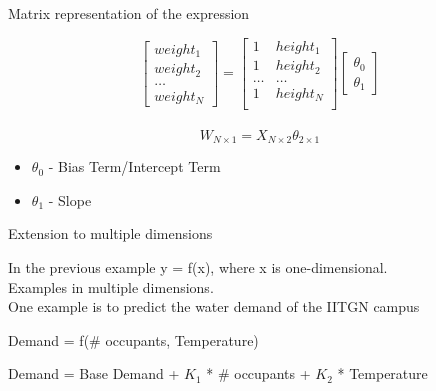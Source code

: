 \documentclass{beamer}
\begin{document}
\begin{frame}{Matrix representation of the expression}



\[\begin{bmatrix}
    weight_{1}   \\
    weight_{2}   \\
    \dots \\
    weight_{N}
\end{bmatrix}
= \begin{bmatrix}
    1& height_{1}   \\
    1& height_{2}   \\
    \dots & \dots  \\
    1& height_{N}   \\
\end{bmatrix}
\begin{bmatrix}
    \theta_{0} \\
    \theta_{1}
\end{bmatrix}\] \\

\pause \[W_{N \times 1}=X_{N \times 2}\theta_{2 \times 1} \]




\pause \begin{itemize}
    \item<+-> $\theta_{0}$ - Bias Term/Intercept Term
    \item<+-> $\theta_{1}$ - Slope
\end{itemize}
\end{frame}



\begin{frame}{Extension to multiple dimensions}

In the previous example y = f(x), where x is one-dimensional.\\
\pause Examples in multiple dimensions.\\
\pause One example is to predict the water demand of the IITGN campus

\small{
\begin{center}
  \pause  \begin{tcolorbox}
        Demand = f(\# occupants, Temperature)
    \end{tcolorbox}
\end{center}

\begin{center}
    \pause \begin{tcolorbox}
        Demand = Base Demand + $K_{1}$ * \# occupants + $K_{2}$ * Temperature
    \end{tcolorbox}
\end{center}
}

\end{frame}
\end{document}
